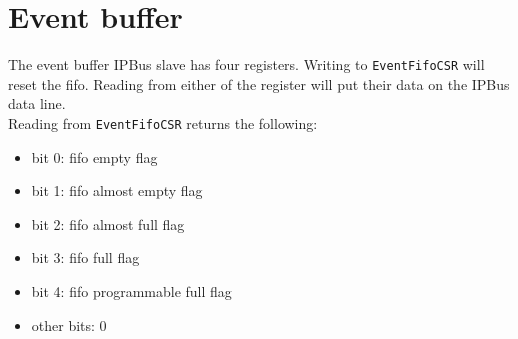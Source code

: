 \section{Event buffer}\label{ch:eventBuffer}
The event buffer IPBus slave has four registers.
Writing to \verb|EventFifoCSR| will reset the \gls{fifo}. Reading from either of the register will put their data on the IPBus data line.\\
Reading from \verb|EventFifoCSR| returns the following:
\begin{itemize}
  \item bit 0: \gls{fifo} empty flag
  \item bit 1: \gls{fifo} almost empty flag
  \item bit 2: \gls{fifo} almost full flag
  \item bit 3: \gls{fifo} full flag
  \item bit 4: \gls{fifo} programmable full flag
  \item other bits: 0
\end{itemize}
